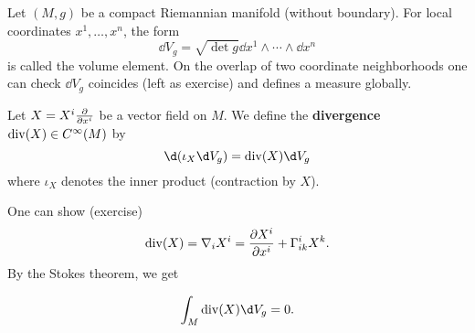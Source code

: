 \documentclass[12pt]{article}
\begin{document}
Let \((M,g)\) be a compact Riemannian manifold (without boundary). For local
coordinates \(x^1,\ldots,x^n\), the form \[
  \dd{V_g}=\sqrt{\det g}\dd{x^1}\wedge \cdots \wedge \dd{x^n}
\] is called the volume element. On the overlap of two coordinate neighborhoods 
one can check \(\dd{V_g}\) coincides (left as exercise) and defines a measure globally.

Let \(X=X^i\pdv{}{x^i}\) be a vector field on \(M\). We define the \textbf{divergence}
\(\operatorname{div}(X)\in C^\infty(M)\) by \[
  \dd{(\iota_X \dd{V_g})}=\op{div}(X)\dd{V_g}
\] where \(\iota_X\) denotes the inner product (contraction by \(X\)).

One can show (exercise) \[
  \operatorname{div}(X)=\nabla_i X^i=\pdv{X^i}{x^i}+\Gamma_{ik}^i X^k
.\] By the Stokes theorem, we get
\begin{theorem}
  \[
    \int_{M}\op{div}(X)\dd{V_g}=0
  .\] 
\end{theorem}
\end{document}
